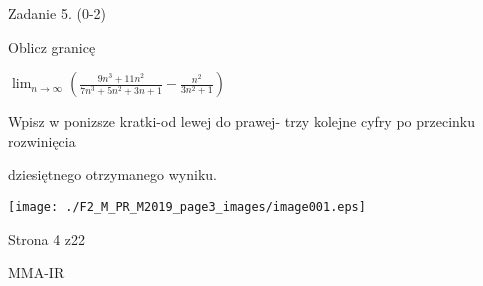 \documentclass[a4paper,12pt]{article}
\begin{document}
Zadanie 5. (0-2)

Oblicz granicę

$\displaystyle \lim_{n\rightarrow\infty}(\frac{9n^{3}+11n^{2}}{7n^{3}+5n^{2}+3n+1}-\frac{n^{2}}{3n^{2}+1})$

Wpisz w ponizsze kratki-od lewej do prawej- trzy kolejne cyfry po przecinku rozwinięcia

dziesiętnego otrzymanego wyniku.
\begin{center}
\texttt{[image: ./F2\_M\_PR\_M2019\_page3\_images/image001.eps]}
\end{center}
Strona 4 z22

MMA-IR
\end{document}
